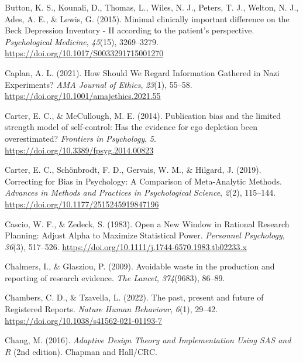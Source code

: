 \documentclass[
  letterpaper,
  DIV=11,
  numbers=noendperiod]{scrreprt}
\newlength{\cslhangindent}
\newlength{\cslentryspacingunit} %
\newenvironment{CSLReferences}[2] %
 {%
  \setlength{\parindent}{0pt}
  \ifodd #1
  \let\oldpar\par
  \def\par{\hangindent=\cslhangindent\oldpar}
  \fi
  \setlength{\parskip}{#2\cslentryspacingunit}
 }%
 {}
\begin{document}
\begin{CSLReferences}{1}{0}
\leavevmode{}%
Button, K. S., Kounali, D., Thomas, L., Wiles, N. J., Peters, T. J.,
Welton, N. J., Ades, A. E., \& Lewis, G. (2015). Minimal clinically
important difference on the {Beck Depression Inventory} - {II} according
to the patient's perspective. \emph{Psychological Medicine},
\emph{45}(15), 3269--3279.
\url{https://doi.org/10.1017/S0033291715001270}

\leavevmode{}%
Caplan, A. L. (2021). How {Should We Regard Information Gathered} in
{Nazi Experiments}? \emph{AMA Journal of Ethics}, \emph{23}(1), 55--58.
\url{https://doi.org/10.1001/amajethics.2021.55}

\leavevmode{}%
Carter, E. C., \& McCullough, M. E. (2014). Publication bias and the
limited strength model of self-control: Has the evidence for ego
depletion been overestimated? \emph{Frontiers in Psychology}, \emph{5}.
\url{https://doi.org/10.3389/fpsyg.2014.00823}

\leavevmode{}%
Carter, E. C., Schönbrodt, F. D., Gervais, W. M., \& Hilgard, J. (2019).
Correcting for {Bias} in {Psychology}: {A Comparison} of {Meta-Analytic
Methods}. \emph{Advances in Methods and Practices in Psychological
Science}, \emph{2}(2), 115--144.
\url{https://doi.org/10.1177/2515245919847196}

\leavevmode{}%
Cascio, W. F., \& Zedeck, S. (1983). Open a {New Window} in {Rational
Research Planning}: {Adjust Alpha} to {Maximize Statistical Power}.
\emph{Personnel Psychology}, \emph{36}(3), 517--526.
\url{https://doi.org/10.1111/j.1744-6570.1983.tb02233.x}

\leavevmode{}%
Chalmers, I., \& Glasziou, P. (2009). Avoidable waste in the production
and reporting of research evidence. \emph{The Lancet}, \emph{374}(9683),
86--89.

\leavevmode{}%
Chambers, C. D., \& Tzavella, L. (2022). The past, present and future of
{Registered Reports}. \emph{Nature Human Behaviour}, \emph{6}(1),
29--42. \url{https://doi.org/10.1038/s41562-021-01193-7}

\leavevmode{}%
Chang, M. (2016). \emph{Adaptive {Design Theory} and {Implementation
Using SAS} and {R}} (2nd edition). {Chapman and Hall/CRC}.


\end{CSLReferences}
\end{document}
